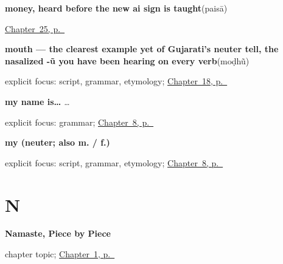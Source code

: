 \noindent\begin{minipage}[t]{\linewidth}
\raggedright
\textbf{money, heard before the new ai sign is taught}\enspace\emph{}\enspace(paisā)\par
\footnotesize \hyperref[ch:gu-hand-money-map]{Chapter~25, p.~\pageref*{ch:gu-hand-money-map}}
\end{minipage}\par\smallskip

\noindent\begin{minipage}[t]{\linewidth}
\raggedright
\textbf{mouth — the clearest example yet of Gujarati's neuter tell, the nasalized -ũ you have been hearing on every verb}\enspace\emph{}\enspace(moḍhũ)\par
\footnotesize explicit focus: script, grammar, etymology; \hyperref[ch:gu-face-parts]{Chapter~18, p.~\pageref*{ch:gu-face-parts}}
\end{minipage}\par\smallskip

\noindent\begin{minipage}[t]{\linewidth}
\raggedright
\textbf{my name is…}\enspace\emph{  … }\par
\footnotesize explicit focus: grammar; \hyperref[ch:introductions]{Chapter~8, p.~\pageref*{ch:introductions}}
\end{minipage}\par\smallskip

\noindent\begin{minipage}[t]{\linewidth}
\raggedright
\textbf{my (neuter; also  m. /  f.)}\enspace\emph{}\par
\footnotesize explicit focus: script, grammar, etymology; \hyperref[ch:introductions]{Chapter~8, p.~\pageref*{ch:introductions}}
\end{minipage}\par\smallskip

\section*{N}

\noindent\begin{minipage}[t]{\linewidth}
\raggedright
\textbf{Namaste, Piece by Piece}\par
\footnotesize chapter topic; \hyperref[ch:first-greeting-script]{Chapter~1, p.~\pageref*{ch:first-greeting-script}}
\end{minipage}\par\smallskip

